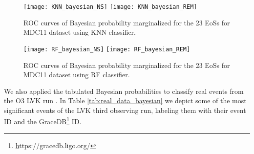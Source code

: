 \begin{figure*}[h]
\texttt{[image: KNN\_bayesian\_NS]}
\texttt{[image: KNN\_bayesian\_REM]}
\caption{\label{fig:rocMDC_KNN}ROC curves of Bayesian probability marginalized for the 23 EoSs for MDC11 dataset using \ac{KNN} classifier.}
\end{figure*}

\begin{figure*}[h]
\texttt{[image: RF\_bayesian\_NS]}
\texttt{[image: RF\_bayesian\_REM]}
\caption{\label{fig:rocMDC_RF}ROC curves of Bayesian probability marginalized for the 23 EoSs for MDC11 dataset using \ac{RF} classifier.}
\end{figure*}

We also applied the tabulated Bayesian probabilities to classify real events from the O3 LVK run \cite{gwtc-2:2021, LIGOScientific:2021djp}.  In Table \ref{tab:real_data_bayesian} we depict some of the most significant events of the LVK third observing run, labeling them with their event ID and the GraceDB\footnote{\href{https://gracedb.ligo.org/}https://gracedb.ligo.org/} ID. 



